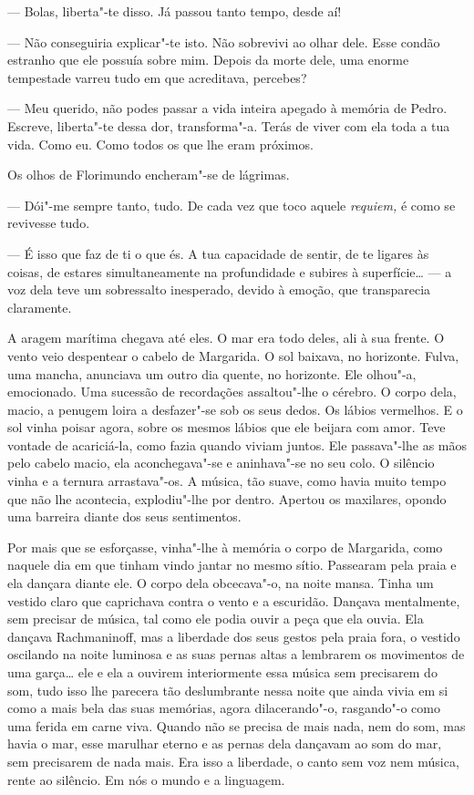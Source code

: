 --- Bolas, liberta"-te disso. Já passou tanto tempo, desde aí!

--- Não conseguiria explicar"-te isto. Não sobrevivi ao olhar dele. Esse
condão estranho que ele possuía sobre mim. Depois da morte dele, uma
enorme tempestade varreu tudo em que acreditava, percebes?

--- Meu querido, não podes passar a vida inteira apegado à memória de
Pedro. Escreve, liberta"-te dessa dor, transforma"-a. Terás de viver com
ela toda a tua vida. Como eu. Como todos os que lhe eram próximos.

Os olhos de Florimundo encheram"-se de lágrimas.

--- Dói"-me sempre tanto, tudo. De cada vez que toco aquele \emph{requiem,}
é como se revivesse tudo.

--- É isso que faz de ti o que és. A tua capacidade de sentir, de te
ligares às coisas, de estares simultaneamente na profundidade e subires
à superfície\ldots{} --- a voz dela teve um sobressalto inesperado, devido à
emoção, que transparecia claramente.

A aragem marítima chegava até eles. O mar era todo deles, ali à sua
frente. O vento veio despentear o cabelo de Margarida. O sol baixava, no
horizonte. Fulva, uma mancha, anunciava um outro dia quente, no
horizonte. Ele olhou"-a, emocionado. Uma sucessão de recordações
assaltou"-lhe o cérebro. O corpo dela, macio, a penugem loira a
desfazer"-se sob os seus dedos. Os lábios vermelhos. E o sol vinha poisar
agora, sobre os mesmos lábios que ele beijara com amor. Teve vontade de
acariciá-la, como fazia quando viviam juntos. Ele passava"-lhe as mãos
pelo cabelo macio, ela aconchegava"-se e aninhava"-se no seu colo. O
silêncio vinha e a ternura arrastava"-os. A música, tão suave, como havia
muito tempo que não lhe acontecia, explodiu"-lhe por dentro. Apertou os
maxilares, opondo uma barreira diante dos seus sentimentos.

Por mais que se esforçasse, vinha"-lhe à memória o corpo de Margarida,
como naquele dia em que tinham vindo jantar no mesmo sítio. Passearam
pela praia e ela dançara diante ele. O corpo dela obcecava"-o, na noite
mansa. Tinha um vestido claro que caprichava contra o vento e a
escuridão. Dançava mentalmente, sem precisar de música, tal como ele
podia ouvir a peça que ela ouvia. Ela dançava Rachmaninoff, mas a
liberdade dos seus gestos pela praia fora, o vestido oscilando na noite
luminosa e as suas pernas altas a lembrarem os movimentos de uma
garça\ldots{} ele e ela a ouvirem interiormente essa música sem
precisarem do som, tudo isso lhe parecera tão deslumbrante nessa noite
que ainda vivia em si como a mais bela das suas memórias, agora
dilacerando"-o, rasgando"-o como uma ferida em carne viva. Quando não se
precisa de mais nada, nem do som, mas havia o mar, esse marulhar eterno
e as pernas dela dançavam ao som do mar, sem precisarem de nada mais.
Era isso a liberdade, o canto sem voz nem música, rente ao silêncio. Em
nós o mundo e a linguagem.


